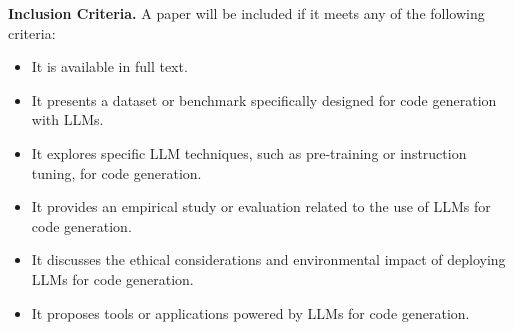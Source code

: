 \textbf{Inclusion Criteria.} 
A paper will be included if it meets any of the following criteria:
\begin{itemize}
    \item It is available in full text.
    \item It presents a dataset or benchmark specifically designed for code generation with LLMs.
    \item It explores specific LLM techniques, such as pre-training or instruction tuning, for code generation.
    \item It provides an empirical study or evaluation related to the use of LLMs for code generation.
    \item It discusses the ethical considerations and environmental impact of deploying LLMs for code generation.
    \item It proposes tools or applications powered by LLMs for code generation.
\end{itemize}


